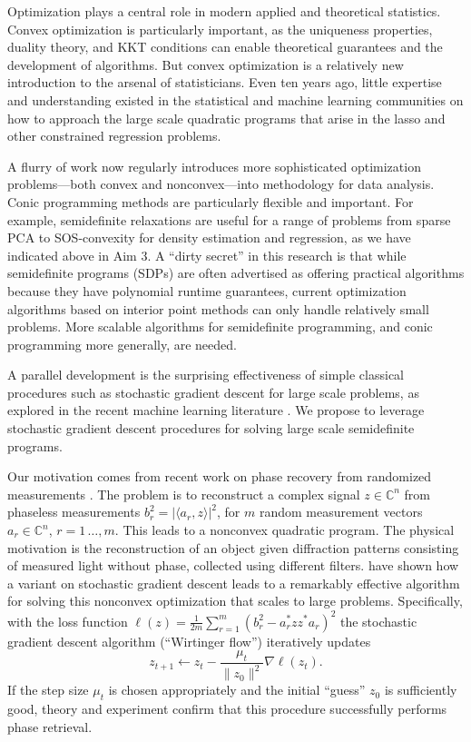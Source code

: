 \def\CC{{\mathbb C}}
\def\tr{\mathop{\rm Tr}}

\vskip-10pt
\background{}
Optimization plays a central role in modern applied and theoretical
statistics.  Convex optimization is particularly important, as
the uniqueness properties, duality theory, and KKT conditions
can enable theoretical guarantees and the development of algorithms.
But convex optimization is a relatively new introduction
to the arsenal of statisticians.  Even ten years ago, little
expertise and understanding existed in the statistical and machine
learning communities on how to approach the large scale quadratic
programs that arise in the lasso and other constrained regression
problems.

A flurry of work now regularly introduces more sophisticated
optimization problems---both convex and nonconvex---into methodology
for data analysis.  Conic programming methods are
particularly flexible and important.  For example, semidefinite
relaxations are useful for a range of problems from sparse PCA
\citep{Aspremont:04,amini:09} to SOS-convexity for density
estimation and regression, as we have indicated above in
Aim 3.  A ``dirty secret'' in this research is that
while semidefinite programs (SDPs) are often advertised as offering practical
algorithms because they have polynomial runtime guarantees, current
optimization algorithms based on interior point
methods can only handle relatively small problems.  
More scalable algorithms for semidefinite programming, and conic
programming more generally, are needed.

A parallel development is the surprising effectiveness
of simple classical procedures such as stochastic gradient descent
for large scale problems, as explored in the recent machine learning literature
\citep{Bach:11,bach:14,hoffman:13}.  We propose to leverage
stochastic gradient descent procedures for solving large scale
semidefinite programs.  

Our motivation comes from recent work on phase
recovery from randomized measurements \citep{candes:14}.  The
problem is to reconstruct a complex signal $z\in\CC^n$ 
from phaseless measurements 
$b_r^2 = \left|\langle a_r , z\rangle\right|^2$, for $m$ random measurement vectors $a_r\in\CC^n$,
$r=1\,\ldots, m$.
This leads to a nonconvex quadratic program.  The physical motivation
is the reconstruction of an object given diffraction patterns
consisting of measured light without phase, collected using 
different filters.  \cite{candes:14} have
shown how a variant on stochastic gradient descent leads
to a remarkably effective algorithm for solving this nonconvex
optimization that scales to large problems.  Specifically,
with the loss function 
$\ell(z) = \frac{1}{2m} \sum_{r=1}^m (b_r^2 - a_r^* zz^* a_r)^2$
the stochastic gradient descent algorithm (``Wirtinger flow'') iteratively updates
$$ z_{t+1} \longleftarrow z_{t} - \frac{\mu_t}{\|z_0\|^2}\nabla \ell(z_t).$$
If the step size $\mu_t$ is chosen appropriately and the initial
``guess'' $z_0$ is sufficiently good, theory and experiment confirm
that this procedure successfully performs phase retrieval.

